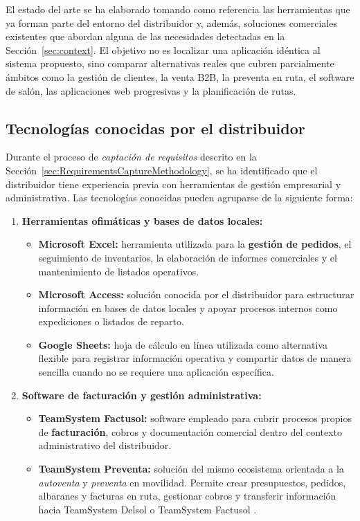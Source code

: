 El estado del arte se ha elaborado tomando como referencia las herramientas que ya forman parte del entorno del distribuidor y, además, soluciones comerciales existentes que abordan alguna de las necesidades detectadas en la Sección~\ref{sec:context}. El objetivo no es localizar una aplicación idéntica al sistema propuesto, sino comparar alternativas reales que cubren parcialmente ámbitos como la gestión de clientes, la venta B2B, la preventa en ruta, el software de salón, las aplicaciones web progresivas y la planificación de rutas.

\subsection{Tecnologías conocidas por el distribuidor}

Durante el proceso de \textit{captación de requisitos} descrito en la Sección~\ref{sec:RequirementsCaptureMethodology}, se ha identificado que el distribuidor tiene experiencia previa con herramientas de gestión empresarial y administrativa. Las tecnologías conocidas pueden agruparse de la siguiente forma:

\begin{enumerate}[label=\textbf{\arabic*.}, leftmargin=1.1cm, itemsep=0.45em, topsep=0.25em]
  \item \textbf{Herramientas ofimáticas y bases de datos locales:}
  \begin{itemize}[topsep=0.1em, itemsep=0.15em]
    \item \textbf{Microsoft Excel:} herramienta utilizada para la \textbf{gestión de pedidos}, el seguimiento de inventarios, la elaboración de informes comerciales y el mantenimiento de listados operativos.
    \item \textbf{Microsoft Access:} solución conocida por el distribuidor para estructurar información en bases de datos locales y apoyar procesos internos como expediciones o listados de reparto.
    \item \textbf{Google Sheets:} hoja de cálculo en línea utilizada como alternativa flexible para registrar información operativa y compartir datos de manera sencilla cuando no se requiere una aplicación específica.
  \end{itemize}

  \item \textbf{Software de facturación y gestión administrativa:}
  \begin{itemize}[topsep=0.1em, itemsep=0.15em]
    \item \textbf{TeamSystem Factusol:} software empleado para cubrir procesos propios de \textbf{facturación}, cobros y documentación comercial dentro del contexto administrativo del distribuidor.
    \item \textbf{TeamSystem Preventa:} solución del mismo ecosistema orientada a la \textit{autoventa} y \textit{preventa} en movilidad. Permite crear presupuestos, pedidos, albaranes y facturas en ruta, gestionar cobros y transferir información hacia TeamSystem Delsol o TeamSystem Factusol \citep{sdelsol-preventa}.
  \end{itemize}
\end{enumerate}


